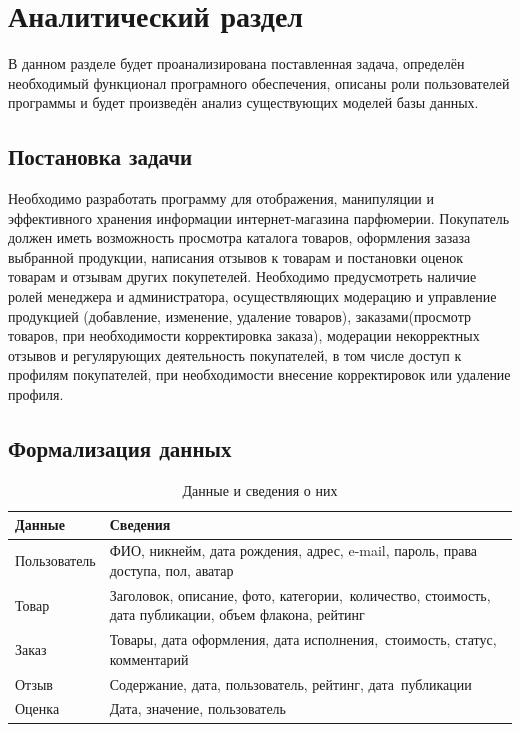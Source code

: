 \chapter{Аналитический раздел}
В данном разделе будет проанализирована поставленная задача, определён необходимый функционал програмного обеспечения, описаны роли пользователей программы и будет произведён анализ существующих моделей базы данных.

\section{Постановка задачи}
Необходимо разработать программу для отображения, манипуляции и эффективного хранения информации интернет-магазина парфюмерии. Покупатель должен иметь возможность просмотра каталога товаров, оформления зазаза выбранной продукции, написания отзывов к товарам и постановки оценок товарам и отзывам других покупетелей. Необходимо предусмотреть наличие ролей менеджера и администратора, осуществляющих модерацию и управление продукцией (добавление, изменение, удаление товаров), заказами(просмотр товаров, при необходимости корректировка заказа), модерации некорректных отзывов и регулярующих деятельность покупателей, в том числе доступ к профилям покупателей, при необходимости внесение корректировок или удаление профиля.
\section{Формализация данных}

\captionsetup{singlelinecheck = false, justification=raggedright}
\begin{table}[h!]
	\begin{center}
		\caption{Данные и сведения о них}
		\begin{tabular}{ |p{5cm}|p{11cm}| }
			\hline
			\textbf{Данные} & \textbf{Сведения}\\ \hline
			Пользователь &  ФИО, никнейм, дата рождения, адрес, e-mail, пароль, права доступа, пол, аватар\\ \hline
			Товар &  Заголовок, описание, фото, категории,\ количество, стоимость, дата публикации, объем флакона, рейтинг\\ \hline
			Заказ &  Товары, дата оформления, дата исполнения,\ стоимость, статус, комментарий\\ \hline
			Отзыв &  Содержание, дата, пользователь, рейтинг, дата\ публикации\\ \hline
			Оценка &  Дата, значение, пользователь\\ \hline
		\end{tabular}
		\label{data-table}
	\end{center}
\end{table}		

